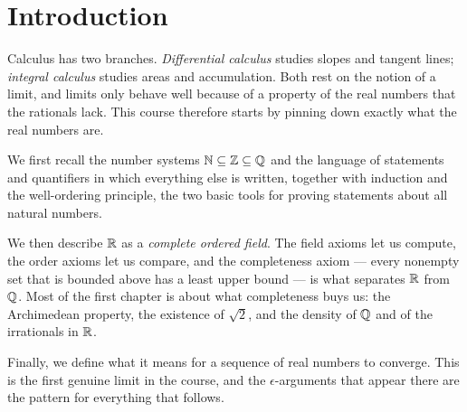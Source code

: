 \section{Introduction}
Calculus has two branches. \emph{Differential calculus} studies slopes and
tangent lines; \emph{integral calculus} studies areas and accumulation. Both
rest on the notion of a limit, and limits only behave well because of a
property of the real numbers that the rationals lack. This course therefore
starts by pinning down exactly what the real numbers are.

We first recall the number systems $\mathbb{N}\subseteq\mathbb{Z}\subseteq\mathbb{Q}$ and the language
of statements and quantifiers in which everything else is written, together
with induction and the well-ordering principle, the two basic tools for
proving statements about all natural numbers.

We then describe $\mathbb{R}$ as a \emph{complete ordered field}. The field axioms
let us compute, the order axioms let us compare, and the completeness axiom
--- every nonempty set that is bounded above has a least upper bound --- is
what separates $\mathbb{R}$ from $\mathbb{Q}$. Most of the first chapter is about what
completeness buys us: the Archimedean property, the existence of $\sqrt2$,
and the density of $\mathbb{Q}$ and of the irrationals in $\mathbb{R}$.

Finally, we define what it means for a sequence of real numbers to converge.
This is the first genuine limit in the course, and the $\epsilon$-arguments
that appear there are the pattern for everything that follows.
